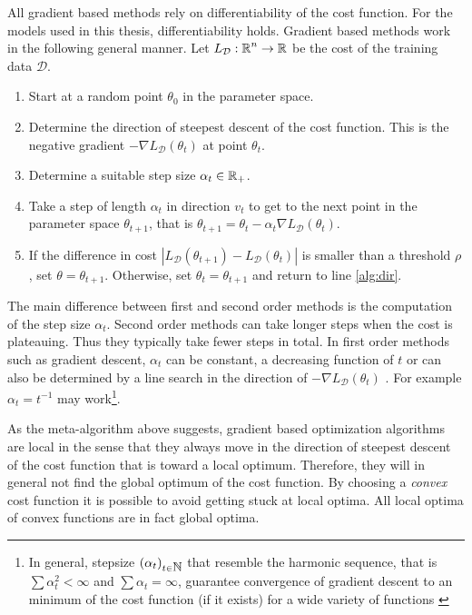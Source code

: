 All gradient based methods rely on differentiability of the cost function. For the models used in this thesis, differentiability holds. Gradient based methods work in the following general manner. Let $L_{\mathcal{D}}:\mbox{$\mathbb R$}^n \rightarrow \mbox{$\mathbb R$}$ be the cost of the training data $\mathcal{D}$.

\begin{enumerate}
\item Start at a random point $\theta_0$ in the parameter space.
\item Determine the direction of steepest descent of the cost function. This is the negative gradient $-\nabla L_{\mathcal{D}}(\theta_t)$ at point $\theta_t$.\label{alg:dir}
\item Determine a suitable step size $\alpha_t \in \mbox{$\mathbb R$}_+$. 
\item Take a step of length $\alpha_t$ in direction $v_t$ to get to the next point in the parameter space $\theta_{t+1}$, that is $\theta_{t+1} = \theta_t - \alpha_t \nabla L_{\mathcal{D}}(\theta_t)$.
\item If the difference in cost $|L_{\mathcal{D}}(\theta_{t+1}) - L_{\mathcal{D}}(\theta_t)|$ is smaller than a threshold $\rho$, set $\theta = \theta_{t+1}$. Otherwise, set $\theta_t = \theta_{t+1}$ and return to line \ref{alg:dir}.
\end{enumerate}

The main difference between first and second order methods is the
computation of the step size $\alpha_t$. Second order methods can take
longer steps when the cost is plateauing. Thus they typically take
fewer steps in total. In first order methods such as gradient descent,
$\alpha_t$ can be constant, a decreasing function of $t$ or can also
be determined by a line search in the direction of $-\nabla
L_{\mathcal{D}}(\theta_t)$ \cite{someone}. For example $\alpha_t =
t^{-1}$ may work\footnote{In general, stepsize $(\alpha_t)_{t \in \mbox{$\mathbb N$}}$
  that resemble the harmonic sequence, that is $\sum \alpha_t^2 <
  \infty$ and $\sum \alpha_t = \infty$, guarantee convergence of
  gradient descent to an minimum of the cost function (if it exists)
  for a wide variety of functions \cite{someone}}.


As the meta-algorithm above suggests, gradient based optimization
algorithms are local in the sense that they always move in the
direction of steepest descent of the cost function that is toward a
local optimum. Therefore, they will in general not find the global
optimum of the cost function. By choosing a {\it convex} cost function
it is possible to avoid getting stuck at local optima. All local
optima of convex functions are in fact global optima. 

